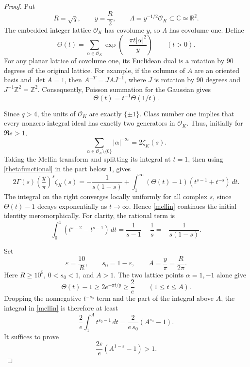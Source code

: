 \documentclass[11pt]{article}
\newcommand{\Z}{\mathbb Z}
\newcommand{\OK}{\mathcal O_K}
\newcommand{\zK}{\zeta_K}
\newcommand{\tht}{\Theta}
\newcommand{\norm}[1]{\lvert #1\rvert}
\begin{document}
\begin{proof}
Put
\[
 R=\sqrt q,\qquad y=\frac R2,\qquad
 \Lambda=y^{-1/2}\OK\subset\mathbb C\simeq\mathbb R^2.
\]
The embedded integer lattice \(\OK\) has covolume \(y\), so
\(\Lambda\) has covolume one. Define
\[
 \tht(t)=\sum_{\alpha\in\OK}
       \exp\left(-\frac{\pi t\norm{\alpha}^2}{y}\right)
       \qquad(t>0).
\]
For any planar lattice of covolume one, its Euclidean dual is a
rotation by \(90\) degrees of the original lattice. For example, if
the columns of \(A\) are an oriented basis and \(\det A=1\), then
\(A^{-T}=JAJ^{-1}\), where \(J\) is rotation by \(90\) degrees
and \(J^{-1}\Z^2=\Z^2\).
Consequently, Poisson summation for the Gaussian gives
\begin{equation}\label{thetafunctional}
 \tht(t)=t^{-1}\tht(1/t).
\end{equation}

Since \(q>4\), the units of \(\OK\) are exactly \(\{\pm1\}\).
Class number one implies that every nonzero integral ideal has
exactly two generators in \(\OK\). Thus, initially for \(\Re s>1\),
\[
 \sum_{\alpha\in\OK\setminus\{0\}}\norm{\alpha}^{-2s}
     =2\zK(s).
\]
Taking the Mellin transform and splitting its integral at \(t=1\),
then using \eqref{thetafunctional} in the part below \(1\), gives
\begin{equation}\label{mellin}
 2\Gamma(s)\left(\frac y\pi\right)^s\zK(s)
 =
 -\frac{1}{s(1-s)}
 +\int_1^\infty(\tht(t)-1)
       \left(t^{s-1}+t^{-s}\right)\,dt .
\end{equation}
The integral on the right converges locally uniformly for all complex
\(s\), since \(\tht(t)-1\) decays exponentially as \(t\to\infty\).
Hence \eqref{mellin} continues the initial identity meromorphically.
For clarity, the rational term is
\[
 \int_0^1(t^{s-2}-t^{s-1})\,dt
 =\frac{1}{s-1}-\frac1s=-\frac{1}{s(1-s)}.
\]

Set
\[
 \varepsilon=\frac{10}{R},\qquad s_0=1-\varepsilon,\qquad
 A=\frac y\pi=\frac{R}{2\pi}.
\]
Here \(R\ge10^5\), \(0<s_0<1\), and \(A>1\).
The two lattice points \(\alpha=1,-1\) alone give
\[
 \tht(t)-1\ge2e^{-\pi t/y}\ge\frac2e
       \qquad(1\le t\le A).
\]
Dropping the nonnegative \(t^{-s_0}\) term and the part of the integral
above \(A\), the integral in \eqref{mellin} is therefore at least
\[
 \frac2e\int_1^A t^{s_0-1}\,dt
    =\frac{2}{e\,s_0}(A^{s_0}-1).
\]
It suffices to prove
\begin{equation}\label{target}
 \frac{2\varepsilon}{e}(A^{1-\varepsilon}-1)>1.
\end{equation}


\end{proof}
\end{document}
